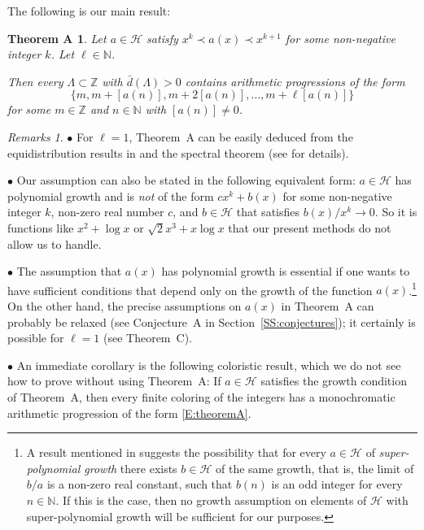 \documentclass[11pt]{amsart}
\renewcommand{\H}{\mathcal{H}}
\newcommand{\R}{\mathbb{R}}
\newcommand{\N}{\mathbb{N}}
\newcommand{\Z}{\mathbb{Z}}
\theoremstyle{plain}
\newtheorem*{theoremA}{Theorem A}
\theoremstyle{definition}
\theoremstyle{remark}
\newtheorem*{remarks}{Remarks}
\begin{document}
The following is our main result:
\begin{theoremA}
  Let $a\in \H$ satisfy $x^k\prec a(x) \prec x^{k+1}$ for some non-negative
  integer $k$. Let $\ell\in \N$.

  Then  every $\Lambda\subset\mathbb{Z}$ with
  $\bar{d}(\Lambda)>0$ contains arithmetic progressions of the form
  \begin{equation}\label{E:theoremA}
    \{m, m+[a(n)],m+2[a(n)],\ldots, m+\ell[a(n)]\}
  \end{equation}
  for some $m\in \Z $ and $n\in\N$ with $[a(n)]\neq 0$.
\end{theoremA}
\begin{remarks}

$\bullet$ For $\ell=1$, Theorem~A can be easily deduced from the equidistribution
    results in \cite{Bo3} and the spectral theorem (see \cite{BKQW}
    for details).

$\bullet$ Our assumption can also be stated in the following equivalent form: $a\in \H$ has  polynomial
 growth  and is \emph{not} of the form $cx^k+b(x)$ for some non-negative integer $k$, non-zero real number $c$, and $b\in\H$ that satisfies $b(x)/x^k\to 0$. So it is functions like $x^2+\log{x}$ or  $\sqrt{2}x^3+ x\log x$ that our present methods do not allow us to handle.



$\bullet$ The assumption that $a(x)$ has  polynomial growth
 is essential if one wants to have sufficient conditions
    that depend only on the growth of the function $a(x)$.\footnote{A result mentioned in
      \cite{Bo3} suggests the possibility that for every $a\in \H$ of
      \emph{super-polynomial growth} there exists $b\in \H$ of the same
      growth, that is, the limit of $b/a$ is a non-zero real constant,
      such that  $b(n)$ is an odd integer for every $n\in\N$. If this is the
      case, then no growth assumption on elements of $\H$ with super-polynomial
       growth will be sufficient for our purposes.}  On the other hand,
    the precise assumptions on $a(x)$ in Theorem~A can probably be
    relaxed (see Conjecture~A in Section~\ref{SS:conjectures}); it certainly is possible for $\ell=1$ (see
    Theorem~C).

$\bullet$
  An immediate corollary is the following coloristic result,
    which we do not see how to prove without using Theorem~A: If $a\in
    \H$ satisfies the growth condition of Theorem~A, then  every
    finite coloring of the integers has a monochromatic
    arithmetic progression of the form \eqref{E:theoremA}.



\end{remarks}
\end{document}
